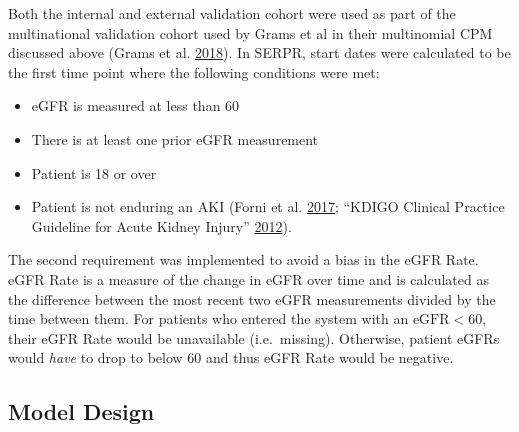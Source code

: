 \documentclass[
]{article}
\providecommand{\tightlist}{%
  \setlength{\itemsep}{0pt}\setlength{\parskip}{0pt}}
\begin{document}
Both the internal and external validation cohort were used as part of the multinational validation cohort used by Grams et al in their multinomial CPM discussed above (Grams et al. \protect\hyperlink{ref-grams_predicting_2018}{2018}). In SERPR, start dates were calculated to be the first time point where the following conditions were met:
\begin{itemize}
\tightlist
\item
  eGFR is measured at less than 60
\item
  There is at least one prior eGFR measurement
\item
  Patient is 18 or over
\item
  Patient is not enduring an AKI (Forni et al. \protect\hyperlink{ref-forni_renal_2017-1}{2017}; ``KDIGO Clinical Practice Guideline for Acute Kidney Injury'' \protect\hyperlink{ref-noauthor_kdigo_2012}{2012}).
\end{itemize}
The second requirement was implemented to avoid a bias in the eGFR Rate. eGFR Rate is a measure of the change in eGFR over time and is calculated as the difference between the most recent two eGFR measurements divided by the time between them. For patients who entered the system with an \(\textrm{eGFR} < 60\), their eGFR Rate would be unavailable (i.e.~missing). Otherwise, patient eGFRs would \emph{have} to drop to below 60 and thus eGFR Rate would be negative.

\hypertarget{model-design}{%
\subsection{Model Design}\label{model-design}}
\end{document}
